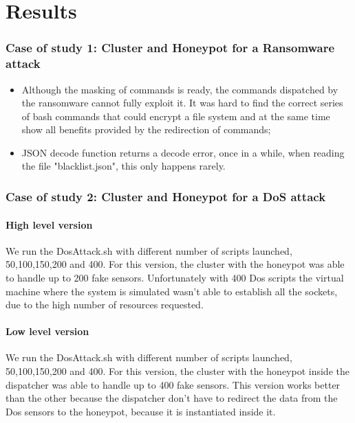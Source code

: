 \chapter{Results}

\subsection{Case of study 1: Cluster and Honeypot for a Ransomware attack}

\begin{itemize}
    \item Although the masking of commands is ready, the commands dispatched by the ransomware cannot fully exploit it. It was hard to find the correct series of bash commands that could encrypt a file system and at the same time show all benefits provided by the redirection of commands;
    \item JSON decode function returns a decode error, once in a while, when reading the file "blacklist.json", this only happens rarely.
\end{itemize}

\subsection{Case of study 2: Cluster and Honeypot for a DoS attack}

\subsubsection{High level version}
We run the DosAttack.sh with different number of scripts launched, 50,100,150,200 and 400. For this version, the cluster with the honeypot was able to handle up to 200 fake sensors. 
Unfortunately with 400 Dos scripts the virtual machine where the system is simulated wasn't able to establish all the sockets, due to the high number of resources requested.

\subsubsection{Low level version} 
We run the DosAttack.sh with different number of scripts launched, 50,100,150,200 and 400. For this version, the cluster with the honeypot inside the dispatcher was able to handle up to 400 fake sensors. 
This version works better than the other because the dispatcher don't have to redirect the data from the Dos sensors to the honeypot, because it is instantiated inside it.


